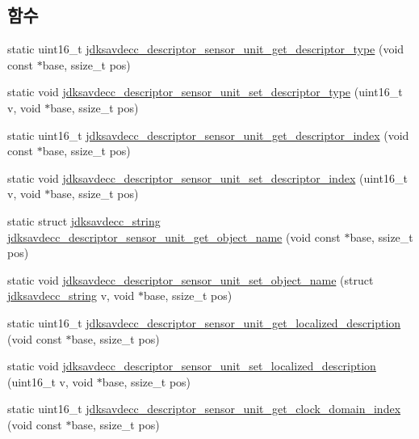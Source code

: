 \subsection*{함수}
\begin{DoxyCompactItemize}
\item 
static uint16\+\_\+t \hyperlink{group__descriptor__sensor_ga5d13b3d75f4d991d4eda17cab924c6b4}{jdksavdecc\+\_\+descriptor\+\_\+sensor\+\_\+unit\+\_\+get\+\_\+descriptor\+\_\+type} (void const $\ast$base, ssize\+\_\+t pos)
\item 
static void \hyperlink{group__descriptor__sensor_gae74607b3aab77e8203f8261594497da7}{jdksavdecc\+\_\+descriptor\+\_\+sensor\+\_\+unit\+\_\+set\+\_\+descriptor\+\_\+type} (uint16\+\_\+t v, void $\ast$base, ssize\+\_\+t pos)
\item 
static uint16\+\_\+t \hyperlink{group__descriptor__sensor_ga55f6c803a4d76731eee01618f1518f5e}{jdksavdecc\+\_\+descriptor\+\_\+sensor\+\_\+unit\+\_\+get\+\_\+descriptor\+\_\+index} (void const $\ast$base, ssize\+\_\+t pos)
\item 
static void \hyperlink{group__descriptor__sensor_gaad033217c34c8ea0e6644cac30821ea1}{jdksavdecc\+\_\+descriptor\+\_\+sensor\+\_\+unit\+\_\+set\+\_\+descriptor\+\_\+index} (uint16\+\_\+t v, void $\ast$base, ssize\+\_\+t pos)
\item 
static struct \hyperlink{structjdksavdecc__string}{jdksavdecc\+\_\+string} \hyperlink{group__descriptor__sensor_ga5f9be104aea9cffe08726cef31facf3e}{jdksavdecc\+\_\+descriptor\+\_\+sensor\+\_\+unit\+\_\+get\+\_\+object\+\_\+name} (void const $\ast$base, ssize\+\_\+t pos)
\item 
static void \hyperlink{group__descriptor__sensor_ga38490505c583726d66ce0839618badd2}{jdksavdecc\+\_\+descriptor\+\_\+sensor\+\_\+unit\+\_\+set\+\_\+object\+\_\+name} (struct \hyperlink{structjdksavdecc__string}{jdksavdecc\+\_\+string} v, void $\ast$base, ssize\+\_\+t pos)
\item 
static uint16\+\_\+t \hyperlink{group__descriptor__sensor_ga0360666fafecdd1a534f8ed718cc3a5f}{jdksavdecc\+\_\+descriptor\+\_\+sensor\+\_\+unit\+\_\+get\+\_\+localized\+\_\+description} (void const $\ast$base, ssize\+\_\+t pos)
\item 
static void \hyperlink{group__descriptor__sensor_gab44a73c297001a3a71b13b868ab97b40}{jdksavdecc\+\_\+descriptor\+\_\+sensor\+\_\+unit\+\_\+set\+\_\+localized\+\_\+description} (uint16\+\_\+t v, void $\ast$base, ssize\+\_\+t pos)
\item 
static uint16\+\_\+t \hyperlink{group__descriptor__sensor_gae61862cba7022c151e662c23949ebe60}{jdksavdecc\+\_\+descriptor\+\_\+sensor\+\_\+unit\+\_\+get\+\_\+clock\+\_\+domain\+\_\+index} (void const $\ast$base, ssize\+\_\+t pos)

\end{DoxyCompactItemize}
